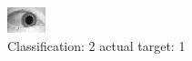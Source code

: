 \begin{figure}[h!]
\begin{center}
\includegraphics[width=0.60\columnwidth]{figures/ID1536_class_2_target_1.png}
\end{center}
\caption{ Classification: 2 actual target: 1}
\label{fig:ID1536_class_2_target_1}
\end{figure}
